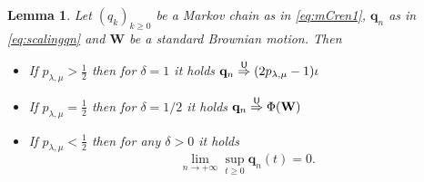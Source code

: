 \documentclass[10pt,a4paper]{amsart}
\newtheorem{lem}{Lemma}
\begin{document}
\begin{lem}\label{lem:scalingMC2}
	Let $(q_k)_{k \ge 0}$ be a Markov chain as in \eqref{eq:mCren1}, $\mathbf{q}_n$ as in \eqref{eq:scalingqn} and $\mathbf{W}$ be a standard Brownian motion. Then
	\begin{itemize}
		\item[(i)] If $p_{\lambda,\mu}>\frac{1}{2}$ then for $\delta=1$ it holds $\displaystyle \mathbf{q}_n \overset{\sf U}{\Rightarrow}(2p_{\lambda,\mu}-1)\iota$
		\item[(ii)] If $p_{\lambda,\mu}=\frac{1}{2}$ then for $\delta=1/2$ it holds $\displaystyle \mathbf{q}_n \overset{\sf U}{\Rightarrow}\Phi(\mathbf{W})$
		\item[(iii)] If $p_{\lambda,\mu}<\frac{1}{2}$ then for any $\delta>0$ it holds 
		\begin{equation*}
		\lim_{n \to +\infty}\sup_{t \ge 0}\mathbf{q}_n(t)=0.
		\end{equation*}
	\end{itemize}
\end{lem}
\end{document}
